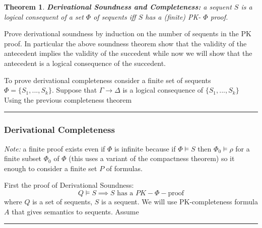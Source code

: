 \documentclass[twoside]{article}
\newcounter{lecnum}
\newtheorem{theorem}{Theorem}[lecnum]
\newenvironment{proof}{{\bf Proof:}}{\hfill\rule{2mm}{2mm}}
\begin{document}
\begin{theorem}
\textbf{Derivational Soundness and Completeness:} a sequent $S$ is a logical consequent of a set $\Phi$ of sequents iff $S$ has a (finite) PK- $\Phi$ proof. 
\end{theorem}
\begin{proof}
Prove derivational soundness by induction on the number of sequents in the PK proof. In particular the above soundness theorem show that the validity of the antecedent implies the validity of the succedent while now we will show that the antecedent is a logical consequence of the succedent. 

To prove derivational completeness consider a finite set of sequents $\Phi = \{S_1, ..., S_k\}$. Suppose that $\Gamma \rightarrow \Delta$ is a logical consequence of $\{S_1, ..., S_k\}$ Using the previous completeness theorem 
\end{proof}

\subsubsection{Derivational Completeness}
\textit{Note:} a finite proof exists even if $\Phi$ is infinite because if $\Phi \vDash S$ then $\Phi_0 \vDash \rho$ for a finite subset $\Phi_0$ of $\Phi$ (this uses a variant of the compactness theorem) so it enough to consider a finite set $P$ of formulas.

\begin{proof}
First the proof of Derivational Soundness:
\[Q \vDash S \implies S \mbox{ has a } PK-\Phi-\mbox{proof}\]
where $Q$ is a set of sequents, $S$ is a sequent. We will use PK-completeness formula $A$ that gives semantics to sequents. Assume
\end{proof} 
\end{document}
